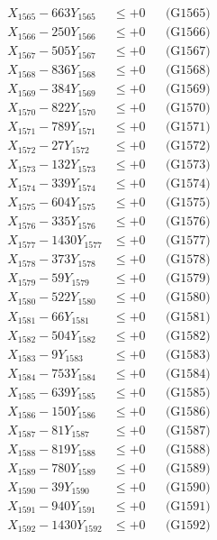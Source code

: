 \documentclass[a4paper,10pt]{article}
\begin{document}
{\begin{align}
X_{1565} - 663Y_{1565} &\leq +0 && \text{(G1565)} \\
X_{1566} - 250Y_{1566} &\leq +0 && \text{(G1566)} \\
X_{1567} - 505Y_{1567} &\leq +0 && \text{(G1567)} \\
X_{1568} - 836Y_{1568} &\leq +0 && \text{(G1568)} \\
X_{1569} - 384Y_{1569} &\leq +0 && \text{(G1569)} \\
X_{1570} - 822Y_{1570} &\leq +0 && \text{(G1570)} \\
\allowbreak
X_{1571} - 789Y_{1571} &\leq +0 && \text{(G1571)} \\
X_{1572} - 27Y_{1572} &\leq +0 && \text{(G1572)} \\
X_{1573} - 132Y_{1573} &\leq +0 && \text{(G1573)} \\
X_{1574} - 339Y_{1574} &\leq +0 && \text{(G1574)} \\
X_{1575} - 604Y_{1575} &\leq +0 && \text{(G1575)} \\
X_{1576} - 335Y_{1576} &\leq +0 && \text{(G1576)} \\
X_{1577} - 1430Y_{1577} &\leq +0 && \text{(G1577)} \\
X_{1578} - 373Y_{1578} &\leq +0 && \text{(G1578)} \\
X_{1579} - 59Y_{1579} &\leq +0 && \text{(G1579)} \\
X_{1580} - 522Y_{1580} &\leq +0 && \text{(G1580)} \\
\allowbreak
X_{1581} - 66Y_{1581} &\leq +0 && \text{(G1581)} \\
X_{1582} - 504Y_{1582} &\leq +0 && \text{(G1582)} \\
X_{1583} - 9Y_{1583} &\leq +0 && \text{(G1583)} \\
X_{1584} - 753Y_{1584} &\leq +0 && \text{(G1584)} \\
X_{1585} - 639Y_{1585} &\leq +0 && \text{(G1585)} \\
X_{1586} - 150Y_{1586} &\leq +0 && \text{(G1586)} \\
X_{1587} - 81Y_{1587} &\leq +0 && \text{(G1587)} \\
X_{1588} - 819Y_{1588} &\leq +0 && \text{(G1588)} \\
X_{1589} - 780Y_{1589} &\leq +0 && \text{(G1589)} \\
X_{1590} - 39Y_{1590} &\leq +0 && \text{(G1590)} \\
\allowbreak
X_{1591} - 940Y_{1591} &\leq +0 && \text{(G1591)} \\
X_{1592} - 1430Y_{1592} &\leq +0 && \text{(G1592)} \\

\end{align}}
\end{document}
